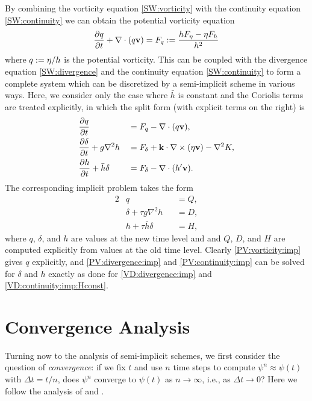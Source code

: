 \documentclass[12pt]{article}
\newcommand{\dt}{\Delta t}
\newcommand{\href}{\bar{h}}
\newcommand{\cross}{\times}
\newcommand{\del}{\nabla}
\begin{document}
By combining the vorticity equation \eqref{SW:vorticity} with the continuity
equation \eqref{SW:continuity} we can obtain the potential vorticity equation
\begin{equation}
   \frac{\partial \PV}{\partial t} + \del\cdot(\PV\vecv) = \FPV
      := \frac{h\Feta - \eta\Fmass}{h^2}
\label{eq:PV}
\end{equation}
where $q := \eta/h$ is the potential vorticity.  This can be coupled with
the divergence equation \eqref{SW:divergence} and the continuity equation
\eqref{SW:continuity} to form a complete system which can be discretized by a
semi-implicit scheme in various ways.  Here, we consider only the case where
$\href$ is constant and the Coriolis terms are treated explicitly, in which
the split form (with explicit terms on the right) is
\begin{alignat}{2}
   &\frac{\partial q}{\partial t} &&= \FPV - \del\cdot(q\vecv) ,
\label{PV:vorticity:split}
\\
   &\frac{\partial \delta}{\partial t} + g\del^2 h &&= 
      \Fdelta + \veck\cdot\del\cross(\eta\vecv) - \del^2 K ,
\label{PV:divergence:split}
\\
   &\frac{\partial h}{\partial t} + \href\delta &&= 
      \Fdelta - \del\cdot(h'\vecv) .
\label{PV:continuity:split}
\end{alignat}
The corresponding implicit problem takes the form
\begin{alignat}{2}
   &q &&= Q,
\label{PV:vorticity:imp}
\\
   &\delta  + \tau g\del^2 h &&= D,
\label{PV:divergence:imp}
\\
  &h + \tau \href\delta &&= H ,
\label{PV:continuity:imp}
\end{alignat}
where $q$, $\delta$, and $h$ are values at the new time level and and $Q$,
$D$, and $H$ are computed explicitly from values at the old time level.
Clearly \eqref{PV:vorticity:imp} gives $q$ explicitly, and
\eqref{PV:divergence:imp} and \eqref{PV:continuity:imp} can be solved for
$\delta$ and $h$ exactly as done for \eqref{VD:divergence:imp} and
\eqref{VD:continuity:imp:Hconst}.

\pagebreak[4]
\section{Convergence Analysis\label{sec:analysis}}
\setcounter{equation}{0}

Turning now to the analysis of semi-implicit schemes, we first consider the
question of \emph{convergence}:  if we fix $t$ and use $n$ time steps to
compute $\psi^n\approx \psi(t)$ with $\dt = t/n$, does $\psi^n$ converge to
$\psi(t)$ as $n\to\infty$, i.e., as $\dt\to0$?  
Here we follow the analysis of \cite{Ascher_Ruuth_Wetton95} and \cite{Kang94}.  
\end{document}
